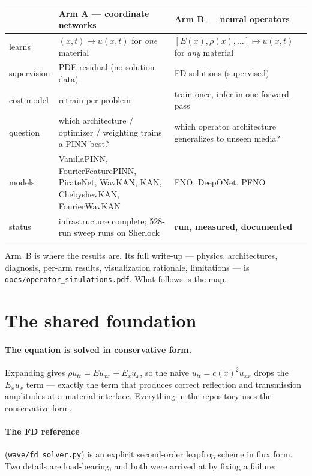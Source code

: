 \documentclass[11pt,a4paper]{article}
\newcommand{\bk}{\discretionary{}{}{}}
\begin{document}
\begin{center}
\small
\begin{tabular}{@{}>{\raggedright\arraybackslash}p{2.6cm}>{\raggedright\arraybackslash}p{6.0cm}>{\raggedright\arraybackslash}p{6.0cm}@{}}
\toprule
 & \textbf{Arm A --- coordinate networks} & \textbf{Arm B --- neural operators}\\
\midrule
learns & $(x,t)\mapsto u(x,t)$ for \emph{one} material
       & $[E(x),\rho(x),\dots]\mapsto u(x,t)$ for \emph{any} material\\[2pt]
supervision & PDE residual (no solution data) & FD solutions (supervised)\\[2pt]
cost model & retrain per problem & train once, infer in one forward pass\\[2pt]
question & which architecture / optimizer / weighting trains a PINN best?
         & which operator architecture generalizes to unseen media?\\[2pt]
models & VanillaPINN, FourierFeaturePINN, PirateNet, WavKAN, KAN,
         ChebyshevKAN, FourierWavKAN
       & FNO, DeepONet, PFNO\\[2pt]
status & infrastructure complete; 528-run sweep runs on Sherlock
       & \textbf{run, measured, documented}\\
\bottomrule
\end{tabular}
\end{center}

Arm~B is where the results are. Its full write-up --- physics, architectures,
diagnosis, per-arm results, visualization rationale, limitations --- is
\texttt{docs/operator\_simulations.\bk pdf}. What follows is the map.

\section{The shared foundation}

\paragraph{The equation is solved in conservative form.} Expanding gives
$\rho u_{tt}=E u_{xx}+E_x u_x$, so the naive $u_{tt}=c(x)^2u_{xx}$ drops the
$E_x u_x$ term --- exactly the term that produces correct reflection and
transmission amplitudes at a material interface. Everything in the repository
uses the conservative form.

\paragraph{The FD reference} (\texttt{wave/fd\_solver.py}) is an explicit
second-order leapfrog scheme in flux form. Two details are load-bearing, and
both were arrived at by fixing a failure:
\end{document}
